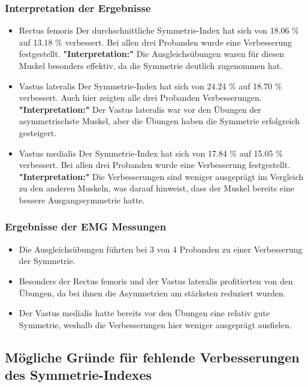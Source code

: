 \subsubsection{Interpretation der Ergebnisse}
\begin{itemize}
    \item Rectus femoris
    Der durchschnittliche Symmetrie-Index hat sich von 18.06 $\%$ auf 13.18 $\%$ verbessert.
    Bei allen drei Probanden wurde eine Verbesserung festgestellt.
    \textbf{"Interpretation:"} Die Ausgleichsübungen waren für diesen Muskel besonders effektiv, da die Symmetrie deutlich zugenommen hat.
    \item Vastus lateralis
    Der Symmetrie-Index hat sich von 24.24 $\%$ auf 18.70 $\%$ verbessert.
    Auch hier zeigten alle drei Probanden Verbesserungen.
    \textbf{"Interpretation:"} Der Vastus lateralis war vor den Übungen der asymmetrischste Muskel, aber die Übungen haben die Symmetrie erfolgreich gesteigert.
    \item Vastus medialis
    Der Symmetrie-Index hat sich von 17.84 $\%$ auf 15.05 $\%$ verbessert.
    Bei allen drei Probanden wurde eine Verbesserung festgestellt.
    \textbf{"Interpretation:"} Die Verbesserungen sind weniger ausgeprägt im Vergleich zu den anderen Muskeln, was darauf hinweist, dass der Muskel bereits eine bessere Ausgangssymmetrie hatte.
\end{itemize}

\subsubsection{Ergebnisse der EMG Messungen}
\begin{itemize}
    \item Die Ausgleichsübungen führten bei 3 von 4 Probanden zu einer Verbesserung der Symmetrie.
    \item Besonders der Rectus femoris und der Vastus lateralis profitierten von den Übungen, da bei ihnen die Asymmetrien am stärksten reduziert wurden.
    \item Der Vastus medialis hatte bereits vor den Übungen eine relativ gute Symmetrie, weshalb die Verbesserungen hier weniger ausgeprägt ausfielen.
\end{itemize}

\subsection{Mögliche Gründe für fehlende Verbesserungen des Symmetrie-Indexes}


